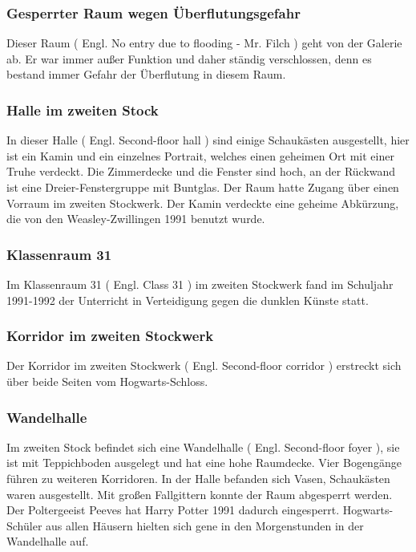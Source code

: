 \documentclass[a4paper, 10pt]{article}
\begin{document}
\subsubsection*{\large Gesperrter Raum wegen Überflutungsgefahr}
Dieser Raum (  Engl.  No entry due to flooding - Mr. Filch ) geht von der Galerie ab. Er war immer außer Funktion und daher ständig verschlossen, denn es bestand immer Gefahr der Überflutung in diesem Raum.
\subsubsection*{\large Halle im zweiten Stock}
In dieser Halle (  Engl.  Second-floor hall ) sind einige Schaukästen ausgestellt, hier ist ein Kamin und ein einzelnes Portrait, welches einen geheimen Ort mit einer Truhe verdeckt. Die Zimmerdecke und die Fenster sind hoch, an der Rückwand ist eine Dreier-Fenstergruppe mit Buntglas. Der Raum hatte Zugang über einen Vorraum im zweiten Stockwerk. Der Kamin verdeckte eine geheime Abkürzung, die von den Weasley-Zwillingen 1991 benutzt wurde.
\subsubsection*{\large Klassenraum 31}
Im Klassenraum 31 (  Engl.  Class 31 ) im zweiten Stockwerk fand im Schuljahr 1991-1992 der Unterricht in Verteidigung gegen die dunklen Künste statt.
\subsubsection*{\large Korridor im zweiten Stockwerk}
Der Korridor im zweiten Stockwerk (  Engl.  Second-floor corridor ) erstreckt sich über beide Seiten vom Hogwarts-Schloss.
\subsubsection*{\large Wandelhalle}
Im zweiten Stock befindet sich eine Wandelhalle (  Engl.  Second-floor foyer ), sie ist mit Teppichboden ausgelegt und hat eine hohe Raumdecke. Vier Bogengänge führen zu weiteren Korridoren. In der Halle befanden sich Vasen, Schaukästen waren ausgestellt. Mit großen Fallgittern konnte der Raum abgesperrt werden. Der Poltergeeist Peeves hat Harry Potter 1991 dadurch eingesperrt. Hogwarts-Schüler aus allen Häusern hielten sich gene in den Morgenstunden in der Wandelhalle auf.
\end{document}
